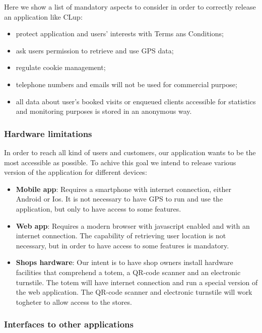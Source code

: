 Here we show a list of mandatory aspects to consider in order to correctly release an application like CLup:
\begin{itemize}
    \item protect application and users' interests with Terms ans Conditions;
    \item ask users permission to retrieve and use GPS data;
    \item regulate cookie management;
    \item telephone numbers and emails will not be used for commercial purpose;
    \item all data about user's booked visits or enqueued clients accessible for statistics and monitoring purposes is stored in an anonymous way.
\end{itemize}

\subsubsection{Hardware limitations}
\label{subsubsect:hardwarelimitations}

In order to reach all kind of users and customers, our application wants to be the most accessible as possible. To achive this goal we intend to release various version of the application for different devices:

\begin{itemize}
    \item \textbf{Mobile app}: Requires a smartphone with internet connection, either Android or Ios. It is not necessary to have GPS to run and use the application, but only to have access to some features.
    \item \textbf{Web app}: Requires a modern browser with javascript enabled and with an internet connection. The capability of retrieving user location is not necessary, but in order to have access to some features is mandatory.
    \item \textbf{Shops hardware}: Our intent is to have shop owners install hardware facilities that comprehend a totem, a QR-code scanner and an electronic turnstile. The totem will have internet connection and run a special version of the web application. The QR-code scanner and electronic turnstile will work togheter to allow access to the stores. 
\end{itemize}

\subsubsection{Interfaces to other applications}
\label{subsubsect:interfacestootherappications}

